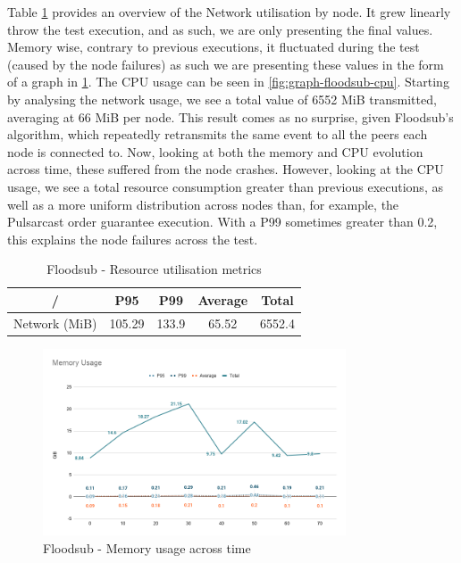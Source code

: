 Table \ref{table:floodsub} provides an overview of the Network utilisation by
node. It grew linearly throw the test execution, and as such, we are only
presenting the final values. Memory wise, contrary to previous executions, it
fluctuated during the test (caused by the node failures) as such we are
presenting these values in the form of a graph in
\ref{fig:graph-floodsub-memory}. The CPU usage can be seen in
\ref{fig:graph-floodsub-cpu}. Starting by analysing the network usage, we see a
total value of 6552 MiB transmitted, averaging at 66 MiB per node. This result
comes as no surprise, given Floodsub's algorithm, which repeatedly retransmits
the same event to all the peers each node is connected to. Now, looking at both
the memory and CPU evolution across time, these suffered from the node crashes.
However, looking at the CPU usage, we see a total resource consumption greater
than previous executions, as well as a more uniform distribution across nodes
than, for example, the Pulsarcast order guarantee execution. With a P99
sometimes greater than 0.2, this explains the node failures across the test.

\begin{table}[!htb]
\caption{Floodsub - Resource utilisation metrics}
\label{table:floodsub}
  \begin{center}
   \begin{tabular}{|c| c c c c|} 
   \hline
   / & P95 & P99 & Average & Total \\ [0.5ex] 
   \hline\hline
   Network (MiB) & 105.29 & 133.9 & 65.52 & 6552.4 \\
   \hline
  \end{tabular}
  \end{center}
\end{table}

\begin{figure}[!htb]
  \centering
  \includegraphics[width=0.8\textwidth]{img/graph-floodsub-memory.png}
  \caption{Floodsub - Memory usage across time}
  \label{fig:graph-floodsub-memory}
\end{figure}

